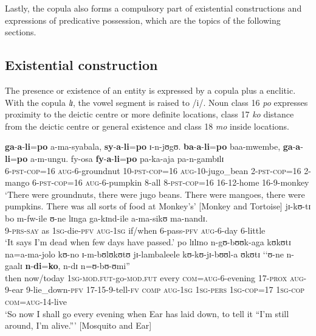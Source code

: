 Lastly, the copula also forms a compulsory part of existential constructions and expressions of predicative possession, which are the topics of the following sections.

\subsection{Existential construction}\label{Existentials}
The presence or existence of an entity is expressed by a copula plus a  enclitic. With the copula \textit{lɪ}, the vowel segment is raised to /i/. Noun class 16 \textit{po} expresses proximity to the deictic centre or more definite locations, class 17 \textit{ko} distance from the deictic centre or general existence and class 18 \textit{mo} inside locations.
\begin{exe}
\ex \label{exExistentialaffirmiert1}
\gll \textbf{ga}-\textbf{a}-\textbf{li}=\textbf{po} a-ma-syabala, \textbf{sy}-\textbf{a}-\textbf{li}=\textbf{po} ɪ-n-jʊgʊ. \textbf{ba}-\textbf{a}-\textbf{li}=\textbf{po} baa-mwembe, \textbf{ga}-\textbf{a}-\textbf{li}=\textbf{po} a-m-ungu. fy-osa \textbf{fy}-\textbf{a}-\textbf{li}=\textbf{po} pa-ka-aja pa-n-gambɪlɪ\\
\textsc{6}-\textsc{pst}-\textsc{cop}=16 \textsc{aug}-6-groundnut 10-\textsc{pst}-\textsc{cop}=16 \textsc{aug}-10-jugo\_bean 2-\textsc{pst}-\textsc{cop}=16 2-mango 6-\textsc{pst}-\textsc{cop}=16 \textsc{aug}-6-pumpkin 8-all 8-\textsc{pst}-\textsc{cop}=16 16-12-home 16-9-monkey\\
\glt \lq There were groundnuts, there were jugo beans. There were mangoes, there were pumpkins. There was all sorts of food at Monkey's' [Monkey and Tortoise] 
\ex \label{exExistentialaffirmiert2}
\gll jɪ-kʊ-tɪ bo m-fw-ile ʊ-ne lɪnga ga-kɪnd-ile a-ma-sikʊ ma-nandɪ.\\
9-\textsc{prs}-\textsc{say} as \textsc{1sg}-die-\textsc{pfv} \textsc{aug}-\textsc{1sg} if/when 6-pass-\textsc{pfv} \textsc{aug}-6-day 6-little\\
\glt \lq It says I'm dead when few days have passed.'
\sn \gll po lɪlɪno n-gʊ-bʊʊk-aga kʊkʊtɪ na=a-ma-jolo kʊ-no ɪ-m-bʊlʊkʊtʊ jɪ-lambaleele kʊ-kʊ-jɪ-bʊʊl-a ʊkʊtɪ \lq\lq ʊ-ne n-gaalɪ \textbf{n}-\textbf{di}=\textbf{ko}, n-dɪ n=ʊ-bʊ-ʊmi''\\
then now/today \textsc{1sg}-\textsc{mod.fut}-go-\textsc{mod.fut} every \textsc{com}=\textsc{aug}-6-evening 17-\textsc{prox} \textsc{aug}-9-ear 9-lie\_down-\textsc{pfv} 17-15-9-tell-\textsc{fv} \textsc{comp} \phantom{\lq\lq}\textsc{aug}-\textsc{1sg} \textsc{1sg}-\textsc{pers} \textsc{1sg}-\textsc{cop}=17 \textsc{1sg}-\textsc{cop} \textsc{com}=\textsc{aug}-14-live\\
\glt `So now I shall go every evening when Ear has laid down, to tell it ``I'm still around, I'm alive.''{}' [Mosquito and Ear]
\end{exe}

